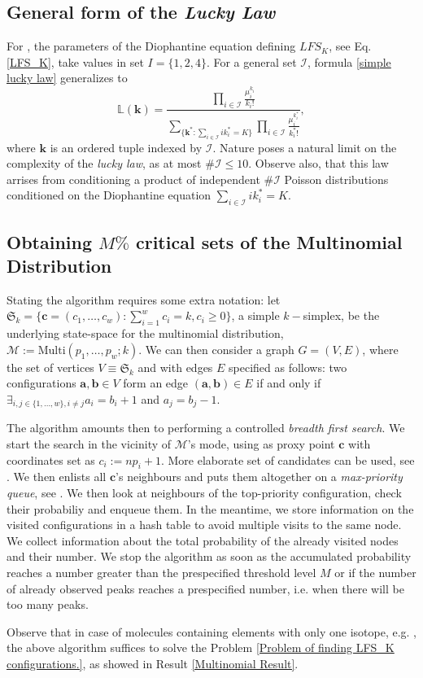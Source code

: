 \subsection*{General form of the \emph{Lucky Law}}

For \molecule, the parameters of the Diophantine equation defining $LFS_K$, see Eq. \eqref{LFS_K}, take values in set $I = \{ 1, 2, 4\}$. For a general set $\mathcal{I}$, formula \eqref{simple lucky law} generalizes to 
\begin{equation*}
	\mathbb{L}( \bm{k} ) = 
	\frac{ 
		\prod_{i \in \mathcal{I}} \frac{ \mu_i^{k_i} }{ {k_i}! } 
	}{ 
		\underset{ \{ \bm{k}^* :  \sum_{i \in \mathcal{I}} i k_i^*  = K \} }{\sum} 	
		\prod_{i \in \mathcal{I}} \frac{ \mu_i^{k_i^*} }{ {k_i^*}! }	
	},
\end{equation*}
where $\bm{k}$ is an ordered tuple indexed by $\mathcal{I}$. Nature poses a natural limit on the complexity of the {\it lucky law}, as at most  $\# \mathcal{I} \leq 10$. Observe also, that this law arrises from conditioning a product of independent $\#\mathcal{I}$ Poisson distributions conditioned on the Diophantine equation $\sum_{i \in \mathcal{I}} i k_i^*  = K$.


\subsection*{Obtaining $M\%$ critical sets of the Multinomial Distribution}

Stating the algorithm requires some extra notation: let $\mathfrak{S}_k = \{ \bm{c} = (c_1, \dots, c_w) : \sum_{i=1}^w c_i = k, c_i \geq 0 \}$, a simple $k-$simplex, be the underlying state-space for the multinomial distribution, $\mathcal{M} := \mathrm{Multi}( p_1, \dots, p_w ; k)$. We can then consider a graph $G = (V,E)$, where the set of vertices $V \equiv \mathfrak{S}_k$ and with edges $E$ specified as follows: two configurations $\bm{a}, \bm{b} \in V$ form an edge $(\bm{a}, \bm{b}) \in E$ if and only if $\exists_{i,j \in \{ 1, \dots, w \}, i \not= j} a_i = b_i + 1$ and $a_j = b_j - 1$. 

The algorithm amounts then to performing a controlled {\it breadth first search}. We start the search in the vicinity of $\mathcal{M}$'s mode, using as proxy point $\bm{c}$ with coordinates set as $ c_i := n p_i + 1$. More elaborate set of candidates can be used, see \cite{Gall2003DeterminationOfTheModesOfMultinomial}. We then enlists all $\bm{c}$'s neighbours and puts them altogether on a {\it max-priority queue}, see \cite{Cormen2001IntroductionToAlgorithms}. We then look at neighbours of the top-priority configuration, check their probabiliy and enqueue them. In the meantime, we store information on the visited configurations in a hash table to avoid multiple visits to the same node. We collect information about the total probability of the already visited nodes and their number. We stop the algorithm as soon as the accumulated probability reaches a number greater than the prespecified threshold level $M$ or if the number of already observed peaks reaches a prespecified number, i.e. when there will be too many peaks.

Observe that in case of molecules containing elements with only one isotope, e.g. \smallMolecule, the above algorithm suffices to solve the Problem \ref{Problem of finding LFS_K configurations.}, as showed in Result \ref{Multinomial Result}.
